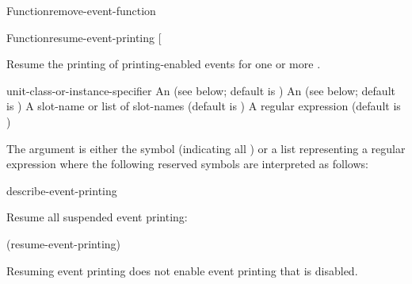 \documentclass[10pt,twoside,english,pdftex]{article}
\begin{document}
\begin{functiondoc}{Function}{remove-event-function}
\fnnote
\instanceevfnsnyi

\end{functiondoc}


\begin{functiondoc}{Function}{resume-event-printing}%
  {[ 
    \nobr{[\var{unit-class-or-instance-specifier\/}]]}
    }
%


\fnsyntax

\fnpurpose Resume the printing of printing-enabled events for one or more
. 

\fnpackage {}

\fnmodule {}

\fnargs
\begin{args}{unit-class-or-instance-specifier}
 An  
(see below; default is )
 An 
(see below; default is )
 A slot-name or list of slot-names
(default is )
 A  regular expression
(default is \code{(*)})
\end{args}

\fndsyntax
\W\supp\tabletop
\eventclassspec
\subeventingspec
\syntaxsep
\unitclassinstancespec
\subclassingspec

\fndescription 
The  argument is either the symbol  (indicating
all ) or a list representing a regular
expression where the following reserved symbols are interpreted as
follows:
\spaceinstanceregexp

\begin{alsos}{describe-event-printing}
\end{alsos}

\fnexample
Resume all suspended event printing:
%
\W\supp
\begin{example}
  (resume-event-printing)
\end{example}

\fnnote
Resuming event printing does not enable event printing that is disabled.

\instanceevfnsnyi

\end{functiondoc}
\end{document}
